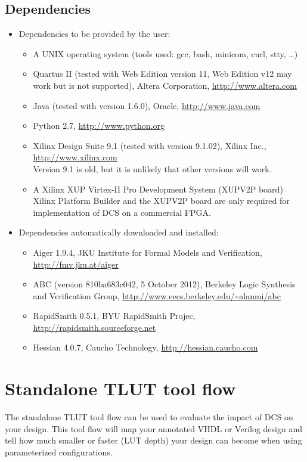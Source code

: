 \documentclass[a4paper,oneside]{memoir}
\begin{document}
\section{Dependencies}
\begin{itemize}
\item Dependencies to be provided by the user:
\begin{itemize}
\item A UNIX operating system (tools used: gcc, bash, minicom, curl, stty, \dots)
\item Quartus II (tested with Web Edition version 11, Web Edition v12 may work but is not supported), Altera Corporation, \url{http://www.altera.com}
\item Java (tested with version 1.6.0), Oracle, \url{http://www.java.com}
\item Python 2.7, \url{http://www.python.org}
\item Xilinx Design Suite 9.1 (tested with version 9.1.02), Xilinx Inc., \url{http://www.xilinx.com}\\
Version 9.1 is old, but it is unlikely that other versions will work.
\item A Xilinx XUP Virtex-II Pro Development System (XUPV2P board)\\
Xilinx Platform Builder and the XUPV2P board are only required for implementation of DCS on a commercial FPGA. 
\end{itemize}
\item Dependencies automatically downloaded and installed:
\begin{itemize}
\item Aiger 1.9.4, JKU Institute for Formal Models and Verification, \url{http://fmv.jku.at/aiger}
\item ABC (version 810ba683c042, 5 October 2012), Berkeley Logic Synthesis and Verification Group, \url{http://www.eecs.berkeley.edu/\~alanmi/abc}
\item RapidSmith 0.5.1, BYU RapidSmith Projec,  \url{http://rapidsmith.sourceforge.net}
\item Hessian 4.0.7, Caucho Technology, \url{http://hessian.caucho.com}
\end{itemize}
\end{itemize}

\clearpage
\chapter{Standalone TLUT tool flow}\label{sec:standalone_flow}
The standalone TLUT tool flow can be used to evaluate the impact of DCS on your design. This tool flow will map your annotated VHDL or Verilog design and tell how much smaller or faster (LUT depth) your design can become when using parameterized configurations.
\end{document}
